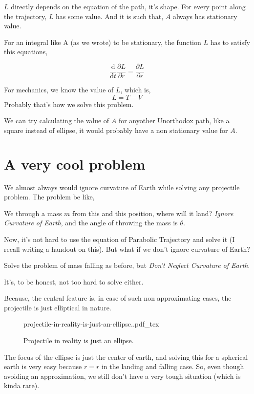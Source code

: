 \documentclass[11pt,a4paper]{article}
\newcommand{\incfig}[1]{%
    \def\svgwidth{0.7\columnwidth}
    {#1.pdf_tex}
}
\newcommand{ \pk }[1]{\begin{problem} #1 \end{problem} }
\begin{document}
$L$ directly depends on the equation of the path, it's shape. For every point along the trajectory, $L$ has some value. And it is such that, $A$ always has stationary value. 

For an integral like A (as we wrote) to be stationary, the function $L$ has to satisfy this equations, 

\[ 
\frac{\mathrm{d} }{\mathrm{d} t} \frac{\partial L}{\partial \dot{r}} = \frac{\partial L}{\partial r}
\]

For mechanics, we know the value of $L$, which is,
\[ 
L = T - V
\]
Probably that's how we solve this problem.

We can try calculating the value of $A$ for anyother Unorthodox path, like a square instead of ellipse, it would probably have a non stationary value for $A$. 


\section{ A very cool problem }
We almost always would ignore curvature of Earth while solving any projectile problem. The problem be like,

\pk{ We through a mass $m$ from this and this position, where will it land? \emph{Ignore Curvature of Earth}, and the angle of throwing the mass is $\theta$.  }

Now, it's not hard to use the equation of Parabolic Trajectory and solve it (I recall writing a handout on this). But what if we don't ignore curvature of Earth?

\pk{ Solve the problem of mass falling as before, but \emph{Don't Neglect Curvature of Earth}.  }

It's, to be honest, not too hard to solve either.

Because, the central feature is, in case of such non approximating cases, the projectile is just elliptical in nature. 

\begin{figure}[ht!]
    \centering
    \incfig{projectile-in-reality-is-just-an-ellipse.}
    \caption{Projectile in reality is just an ellipse.}
    \label{fig:projectile-in-reality-is-just-an-ellipse.}
\end{figure}


The focus of the ellipse is just the center of earth, and solving this for a spherical earth is very easy because $r=r$ in the landing and falling case. So, even though avoiding an approximation, we still don't have a very tough situation (which is kinda rare).
\end{document}
